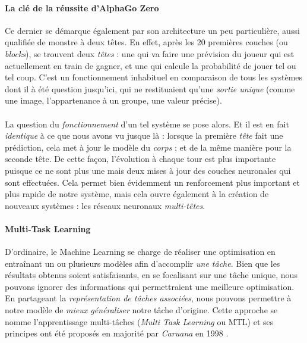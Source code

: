 \paragraph{La clé de la réussite d'AlphaGo Zero} Ce dernier se démarque également par son architecture un peu particulière,
aussi qualifiée de \guillemotleft monstre à deux têtes\guillemotright \cite{AlphaGo3}. En effet, après les 20 premières
couches (ou \emph{blocks}), se trouvent deux \emph{têtes} : une qui va faire une prévision du joueur qui est actuellement
en train de gagner, et une qui calcule la probabilité de jouer tel ou tel coup. C'est un fonctionnement inhabituel en comparaison de tous
les systèmes dont il à été question jusqu'ici, qui ne restituaient qu'une \emph{sortie unique} (comme une image, l'appartenance
à un groupe, une valeur précise).

\paragraph{} La question du \emph{fonctionnement} d'un tel système se pose alors. Et il est en fait \emph{identique}
à ce que nous avons vu jusque là : lorsque la première \emph{tête} fait une prédiction, cela met à jour le modèle
du \emph{corps} ; et de la même manière pour la seconde tête. De cette façon, l'évolution à chaque tour est plus importante
puisque ce ne sont plus une mais deux mises à jour des couches neuronales qui sont effectuées. Cela permet bien évidemment
un renforcement plus important et plus rapide de notre système, mais cela ouvre également à la création de nouveaux systèmes :
les réseaux neuronaux \emph{multi-têtes}.

\paragraph{Multi-Task Learning} D'ordinaire, le Machine Learning se charge de réaliser une optimisation
en entraînant un ou plusieurs modèles afin d'accomplir \emph{une tâche}. Bien que les résultats obtenus soient satisfaisants, en se 
focalisant sur une tâche unique, nous pouvons ignorer des informations qui permettraient une meilleure optimisation. En partageant la 
\emph{représentation de tâches associées}, nous pouvons permettre à notre modèle de \emph{mieux généraliser} notre tâche d'origine.
Cette approche se nomme l'apprentissage multi-tâches (\emph{Multi Task Learning} ou MTL) et ses principes ont été proposés en majorité 
par \emph{Caruana} en 1998 \cite{NeuralNets1}.

